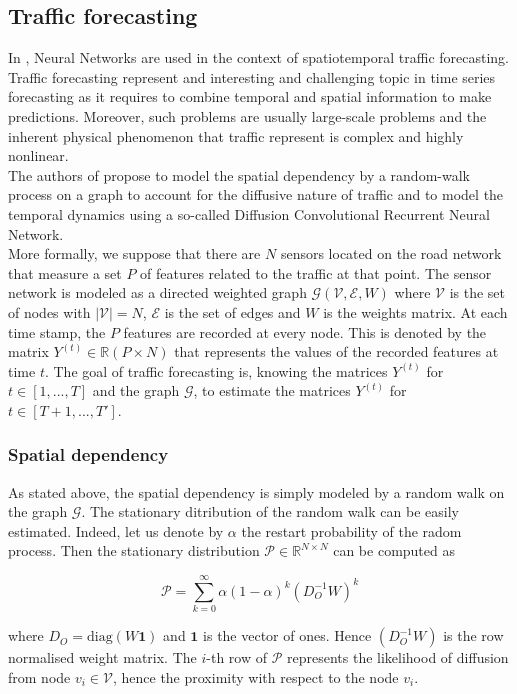 \documentclass{article}
\begin{document}
\subsection*{Traffic forecasting}
In \cite{Traffic}, Neural Networks are used in the context of spatiotemporal traffic forecasting. Traffic forecasting represent and interesting and challenging topic in time series forecasting as it requires to combine temporal and spatial information to make predictions. Moreover, such problems are usually large-scale problems and the inherent physical phenomenon that traffic represent is complex and highly nonlinear. \\
The authors of \cite{Traffic} propose to model the spatial dependency by a random-walk process on a graph to account for the diffusive nature of traffic and to model the temporal dynamics using a so-called Diffusion Convolutional Recurrent Neural Network. \\
More formally, we suppose that there are $N$ sensors located on the road network that measure a set $P$ of features related to the traffic at that point.
The sensor network is modeled as a directed weighted graph $\mathcal{G}(\mathcal{V}, \mathcal{E}, W)$ where $\mathcal{V}$ is the set of nodes with $|\mathcal{V}| = N$, $\mathcal{E}$ is the set of edges and $W$ is the weights matrix. At each time stamp, the $P$ features are recorded at every node. This is denoted by the matrix $Y^{(t)} \in \mathbb{R}(P \times N)$ that represents the values of the recorded features at time $t$.
The goal of traffic forecasting is, knowing the matrices $Y^{(t)}$ for $t \in [1,...,T]$ and the graph $\mathcal{G}$, to estimate the matrices $Y^{(t)}$ for $t \in [T+1, ..., T']$.

\subsubsection*{Spatial dependency}
As stated above, the spatial dependency is simply modeled by a random walk on the graph $\mathcal{G}$. The stationary ditribution of the random walk can be easily estimated. Indeed, let us denote by $\alpha$ the restart probability of the radom process. Then the stationary distribution $\mathcal{P} \in \mathbb{R}^{N \times N}$ can be computed as

$$\mathcal{P} = \sum_{k=0}^{\infty} \alpha (1-\alpha)^k (D_{O}^{-1}W)^k$$

where $D_{O} = \text{diag}(W\mathbf{1})$ and $\mathbf{1}$ is the vector of ones. Hence $(D_{O}^{-1}W)$ is the row normalised weight matrix. The $i$-th row of $\mathcal{P}$ represents the likelihood of diffusion from node $v_i \in \mathcal{V}$, hence the proximity with respect to the node $v_i$.
\end{document}
